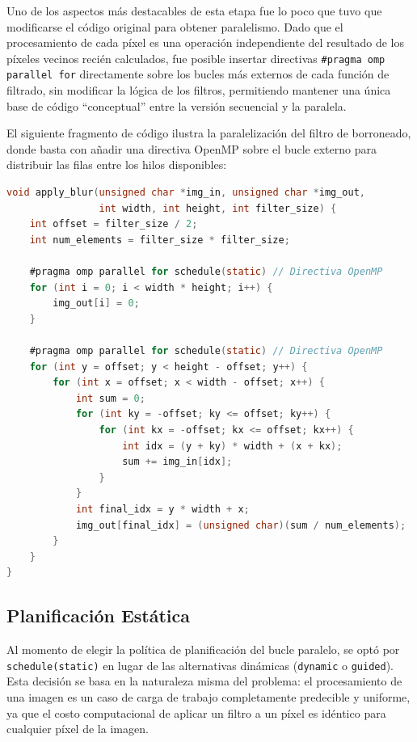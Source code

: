Uno de los aspectos más destacables de esta etapa fue lo poco que tuvo que modificarse el código original para obtener paralelismo. Dado que el procesamiento de cada píxel es una operación independiente del resultado de los píxeles vecinos recién calculados, fue posible insertar directivas \texttt{\#pragma omp parallel for} directamente sobre los bucles más externos de cada función de filtrado, sin modificar la lógica de los filtros, permitiendo mantener una única base de código ``conceptual'' entre la versión secuencial y la paralela.

El siguiente fragmento de código ilustra la paralelización del filtro de borroneado, donde basta con añadir una directiva OpenMP sobre el bucle externo para distribuir las filas entre los hilos disponibles:

\begin{lstlisting}[language=C, caption={Paralelización del filtro Box Blur con OpenMP}, label=list:blur_omp]
void apply_blur(unsigned char *img_in, unsigned char *img_out,
                int width, int height, int filter_size) {
    int offset = filter_size / 2;
    int num_elements = filter_size * filter_size;

    #pragma omp parallel for schedule(static) // Directiva OpenMP
    for (int i = 0; i < width * height; i++) {
        img_out[i] = 0;
    }

    #pragma omp parallel for schedule(static) // Directiva OpenMP
    for (int y = offset; y < height - offset; y++) {
        for (int x = offset; x < width - offset; x++) {
            int sum = 0;
            for (int ky = -offset; ky <= offset; ky++) {
                for (int kx = -offset; kx <= offset; kx++) {
                    int idx = (y + ky) * width + (x + kx);
                    sum += img_in[idx];
                }
            }
            int final_idx = y * width + x;
            img_out[final_idx] = (unsigned char)(sum / num_elements);
        }
    }
}
\end{lstlisting}


\subsection{Planificación Estática}

Al momento de elegir la política de planificación del bucle paralelo, se optó por \texttt{schedule(static)} en lugar de las alternativas dinámicas (\texttt{dynamic} o \texttt{guided}). Esta decisión se basa en la naturaleza misma del problema: el procesamiento de una imagen es un caso de carga de trabajo completamente predecible y uniforme, ya que el costo computacional de aplicar un filtro a un píxel es idéntico para cualquier píxel de la imagen.

